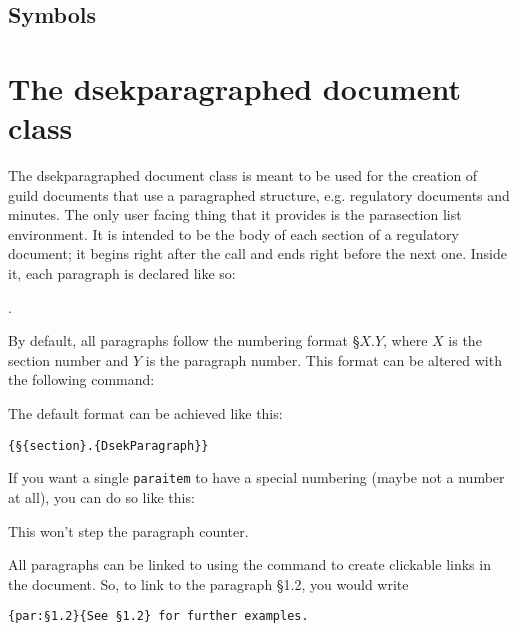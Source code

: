 \documentclass[a4paper, oneside]{ltxdoc}
\begin{document}
\subsection{Symbols}

\section{The \textsf{dsekparagraphed} document class}
The \textsf{dsekparagraphed} document class is meant to be used for the creation
of guild documents that use a paragraphed structure, e.g. regulatory documents
and minutes.  The only user facing thing that it provides is the
\textsf{parasection} list environment.  It is intended to be the body of each
section of a regulatory document; it begins right after the  call
and ends right before the next one.  Inside it, each paragraph is declared like
so:

\begin{center}
  .
\end{center}

By default, all paragraphs follow the numbering format §\(X.Y\), where \(X\) is
the section number and \(Y\) is the paragraph number.  This format can be
altered with the following command:

\begin{center}
\end{center}

The default format can be achieved like this:

\begin{center}
  \texttt{\{§\{section\}.\{DsekParagraph\}\}}
\end{center}

If you want a single \texttt{paraitem} to have a special numbering (maybe not a
number at all), you can do so like this:

\begin{center}
\end{center}

This won't step the paragraph counter.

All paragraphs can be linked to using the  command to create
clickable links in the document.  So, to link to the paragraph §1.2, you would
write

\begin{center}
  \texttt{\{par:§1.2\}\{See §1.2\} for further examples.}
\end{center}
\end{document}
